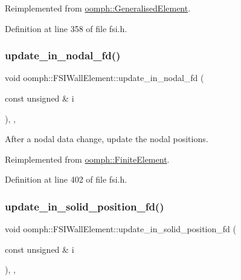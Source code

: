 Reimplemented from \hyperlink{classoomph_1_1GeneralisedElement_a0c94ccb2cad3bcf15f97a6e5a6dff90b}{oomph\+::\+Generalised\+Element}.



Definition at line 358 of file fsi.\+h.

\mbox{\label{classoomph_1_1FSIWallElement_adcde92f149843f4a68dffec420b54c6c}} 
\subsubsection{\texorpdfstring{update\+\_\+in\+\_\+nodal\+\_\+fd()}{update\_in\_nodal\_fd()}}
{\footnotesize\ttfamily void oomph\+::\+F\+S\+I\+Wall\+Element\+::update\+\_\+in\+\_\+nodal\+\_\+fd (\begin{DoxyParamCaption}\item[{const unsigned \&}]{i }\end{DoxyParamCaption})\hspace{0.3cm}{\ttfamily [inline]}, {\ttfamily [protected]}, {\ttfamily [virtual]}}



After a nodal data change, update the nodal positions. 



Reimplemented from \hyperlink{classoomph_1_1FiniteElement_a4557238570f3252942df237986998118}{oomph\+::\+Finite\+Element}.



Definition at line 402 of file fsi.\+h.

\mbox{\label{classoomph_1_1FSIWallElement_ae05300394e531c7b80dc44d1f5e1dbfe}} 
\subsubsection{\texorpdfstring{update\+\_\+in\+\_\+solid\+\_\+position\+\_\+fd()}{update\_in\_solid\_position\_fd()}}
{\footnotesize\ttfamily void oomph\+::\+F\+S\+I\+Wall\+Element\+::update\+\_\+in\+\_\+solid\+\_\+position\+\_\+fd (\begin{DoxyParamCaption}\item[{const unsigned \&}]{i }\end{DoxyParamCaption})\hspace{0.3cm}{\ttfamily [inline]}, {\ttfamily [protected]}, {\ttfamily [virtual]}}



